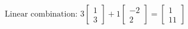 \documentclass[preview]{standalone}
\begin{document}
\begin{align*}
\text{Linear combination: } 3 \begin{bmatrix} 1 \\ 3 \end{bmatrix} + 1 \begin{bmatrix} -2 \\ 2 \end{bmatrix} = \begin{bmatrix} 1 \\ 11 \end{bmatrix}
\end{align*}
\end{document}
